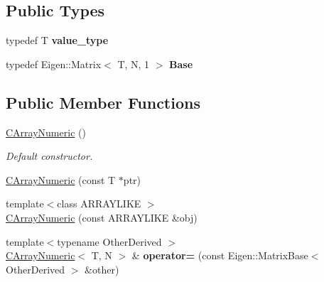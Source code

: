 \subsection*{Public Types}
\begin{DoxyCompactItemize}
\item 
typedef T {\bfseries value\+\_\+type}\hypertarget{classydlidar_1_1math_1_1_c_array_numeric_a2edaba56fdab59906376fdf1f67b390d}{}\label{classydlidar_1_1math_1_1_c_array_numeric_a2edaba56fdab59906376fdf1f67b390d}

\item 
typedef Eigen\+::\+Matrix$<$ T, N, 1 $>$ {\bfseries Base}\hypertarget{classydlidar_1_1math_1_1_c_array_numeric_a670f3d0996d8b5d11342f36c15b3aad8}{}\label{classydlidar_1_1math_1_1_c_array_numeric_a670f3d0996d8b5d11342f36c15b3aad8}

\end{DoxyCompactItemize}
\subsection*{Public Member Functions}
\begin{DoxyCompactItemize}
\item 
\hyperlink{classydlidar_1_1math_1_1_c_array_numeric_a3866d69effe6e4b40a367eea349aafbe}{C\+Array\+Numeric} ()\hypertarget{classydlidar_1_1math_1_1_c_array_numeric_a3866d69effe6e4b40a367eea349aafbe}{}\label{classydlidar_1_1math_1_1_c_array_numeric_a3866d69effe6e4b40a367eea349aafbe}

\begin{DoxyCompactList}\small\item\em Default constructor. \end{DoxyCompactList}\item 
\hyperlink{classydlidar_1_1math_1_1_c_array_numeric_a6e18b54e7fbd8aee014b4de2ed49a1b6}{C\+Array\+Numeric} (const T $\ast$ptr)
\item 
{\footnotesize template$<$class A\+R\+R\+A\+Y\+L\+I\+KE $>$ }\\\hyperlink{classydlidar_1_1math_1_1_c_array_numeric_a0bdbaec16dc3881278dc50d7d8a5cb3a}{C\+Array\+Numeric} (const A\+R\+R\+A\+Y\+L\+I\+KE \&obj)
\item 
{\footnotesize template$<$typename Other\+Derived $>$ }\\\hyperlink{classydlidar_1_1math_1_1_c_array_numeric}{C\+Array\+Numeric}$<$ T, N $>$ \& {\bfseries operator=} (const Eigen\+::\+Matrix\+Base$<$ Other\+Derived $>$ \&other)\hypertarget{classydlidar_1_1math_1_1_c_array_numeric_a6073b1f9bb92505fbf8c53d460a53c75}{}\label{classydlidar_1_1math_1_1_c_array_numeric_a6073b1f9bb92505fbf8c53d460a53c75}

\end{DoxyCompactItemize}


